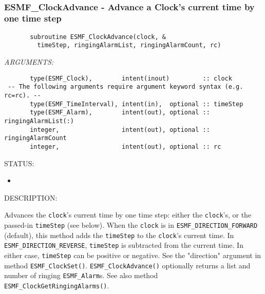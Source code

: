  
\mbox{}\hrulefill\ 
 
\subsubsection [ESMF\_ClockAdvance] {ESMF\_ClockAdvance - Advance a Clock's current time by one time step}


 
\begin{verbatim}       subroutine ESMF_ClockAdvance(clock, &
         timeStep, ringingAlarmList, ringingAlarmCount, rc)
 \end{verbatim}{\em ARGUMENTS:}
\begin{verbatim}       type(ESMF_Clock),        intent(inout)         :: clock
 -- The following arguments require argument keyword syntax (e.g. rc=rc). --
       type(ESMF_TimeInterval), intent(in),  optional :: timeStep
       type(ESMF_Alarm),        intent(out), optional :: ringingAlarmList(:)
       integer,                 intent(out), optional :: ringingAlarmCount
       integer,                 intent(out), optional :: rc\end{verbatim}
{\sf STATUS:}
   \begin{itemize}
   \item{}
   \end{itemize}
  
{\sf DESCRIPTION:\\ }


       \begin{sloppypar}
       Advances the {\tt clock}'s current time by one time step:  either the
       {\tt clock}'s, or the passed-in {\tt timeStep} (see below).  When the
       {\tt clock} is in {\tt ESMF\_DIRECTION\_FORWARD} (default), this method
       adds the {\tt timeStep} to the {\tt clock}'s current time.
       In {\tt ESMF\_DIRECTION\_REVERSE}, {\tt timeStep} is subtracted from the
       current time.  In either case, {\tt timeStep} can be positive or negative.
       See the "direction" argument in method {\tt ESMF\_ClockSet()}.
       {\tt ESMF\_ClockAdvance()} optionally returns a list and number of ringing
       {\tt ESMF\_Alarm}s.  See also method {\tt ESMF\_ClockGetRingingAlarms()}.
       \end{sloppypar}
  
